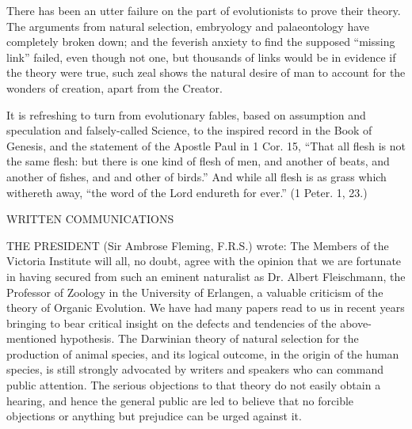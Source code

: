 There has been an utter failure on the part of evolutionists to prove their theory. The
arguments from natural selection, embryology and palaeontology have completely broken
down; and the feverish anxiety to find the supposed ``missing link'' failed, even though not
one, but thousands of links would be in evidence if the theory were true, such zeal shows the
natural desire of man to account for the wonders of creation, apart from the Creator.

It is refreshing to turn from evolutionary fables, based on assumption and speculation and
falsely-called Science, to the inspired record in the Book of Genesis, and the statement of the
Apostle Paul in 1 Cor. 15, ``That all flesh is not the same flesh: but there is one kind of flesh
of men, and another of beats, and another of fishes, and and other of birds.'' And while all
flesh is as grass which withereth away, ``the word of the Lord endureth for ever.'' (1 Peter. 1,
23.)

WRITTEN COMMUNICATIONS

THE PRESIDENT (Sir Ambrose Fleming, F.R.S.) wrote: The Members of the Victoria
Institute will all, no doubt, agree with the opinion that we are fortunate in having secured
from such an eminent naturalist as Dr. Albert Fleischmann, the Professor of Zoology in the
University of Erlangen, a valuable criticism of the theory of Organic Evolution. We have had
many papers read to us in recent years bringing to bear critical insight on the defects and
tendencies of the above-mentioned hypothesis. The Darwinian theory of natural selection for
the production of animal species, and its logical outcome, in the origin of the human species,
is still strongly advocated by writers and speakers who can command public attention. The
serious objections to that theory do not easily obtain a hearing, and hence the general public
are led to believe that no forcible objections or anything but prejudice can be urged against it.

